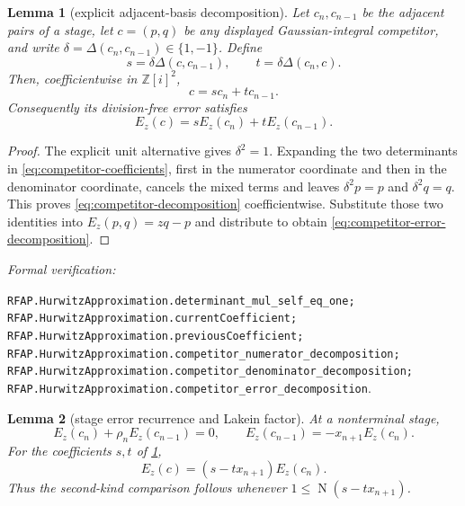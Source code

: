 \documentclass[11pt]{article}
\newtheorem{lemma}[lemma]{Lemma}
\newcommand{\Zi}{\mathbb{Z}[i]}
\newcommand{\Norm}[1]{\operatorname{N}\!\left(#1\right)}
\newcommand{\leanref}[1]{\par\smallskip\noindent
  \emph{Formal verification:}\par\nobreak
  {\raggedright\nolinkurl{#1}.\par}}
\begin{document}
\begin{lemma}[explicit adjacent-basis decomposition]
\label{lem:adjacent-basis-decomposition}
Let $c_n,c_{n-1}$ be the adjacent pairs of a stage, let $c=(p,q)$ be any
displayed Gaussian-integral competitor, and write
$\delta=\Delta(c_n,c_{n-1})\in\{1,-1\}$.  Define
\begin{equation}
\label{eq:competitor-coefficients}
 s=\delta\Delta(c,c_{n-1}),
 \qquad t=\delta\Delta(c_n,c).
\end{equation}
Then, coefficientwise in $\Zi^2$,
\begin{equation}
\label{eq:competitor-decomposition}
                         c=sc_n+tc_{n-1}.
\end{equation}
Consequently its division-free error satisfies
\begin{equation}
\label{eq:competitor-error-decomposition}
            E_z(c)=sE_z(c_n)+tE_z(c_{n-1}).
\end{equation}
\end{lemma}

\begin{proof}
The explicit unit alternative gives $\delta^2=1$.  Expanding the two
determinants in \eqref{eq:competitor-coefficients}, first in the numerator
coordinate and then in the denominator coordinate, cancels the mixed terms
and leaves $\delta^2p=p$ and $\delta^2q=q$.  This proves
\eqref{eq:competitor-decomposition} coefficientwise.  Substitute those two
identities into $E_z(p,q)=zq-p$ and distribute to obtain
\eqref{eq:competitor-error-decomposition}.
\end{proof}

\leanref{RFAP.HurwitzApproximation.determinant_mul_self_eq_one;
RFAP.HurwitzApproximation.currentCoefficient;
RFAP.HurwitzApproximation.previousCoefficient;
RFAP.HurwitzApproximation.competitor_numerator_decomposition;
RFAP.HurwitzApproximation.competitor_denominator_decomposition;
RFAP.HurwitzApproximation.competitor_error_decomposition}

\begin{lemma}[stage error recurrence and Lakein factor]
\label{lem:lakein-factor}
At a nonterminal stage,
\begin{equation}
\label{eq:stage-error-recurrence}
 E_z(c_n)+\rho_nE_z(c_{n-1})=0,
 \qquad
 E_z(c_{n-1})=-x_{n+1}E_z(c_n).
\end{equation}
For the coefficients $s,t$ of
\cref{lem:adjacent-basis-decomposition},
\begin{equation}
\label{eq:lakein-factor}
                         E_z(c)=(s-tx_{n+1})E_z(c_n).
\end{equation}
Thus the second-kind comparison follows whenever
$1\le\Norm{s-tx_{n+1}}$.
\end{lemma}
\end{document}
